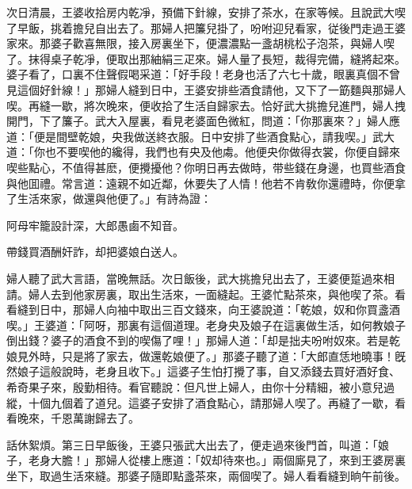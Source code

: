 次日清晨，王婆收拾房内乾凈，預備下針線，安排了茶水，在家等候。且說武大喫了早飯，挑着擔兒自出去了。那婦人把簾兒掛了，吩咐迎兒看家，従後門走過王婆家來。那婆子歡喜無限，接入房裏坐下，便濃濃點一盞胡桃松子泡茶，與婦人喫了。抹得桌子乾凈，便取出那紬絹三疋來。婦人量了長短，裁得完備，縫將起來。婆子看了，口裏不住聲假喝采道：「好手段！老身也活了六七十歲，眼裏真個不曾見這個好針線！」那婦人縫到日中，王婆安排些酒食請他，又下了一筯麵與那婦人喫。再縫一歇，將次晚來，便收拾了生活自歸家去。恰好武大挑擔兒進門，婦人拽開門，下了簾子。武大入屋裏，看見老婆面色微紅，問道：「你那裏來？」婦人應道：「便是間壁乾娘，央我做送終衣服。日中安排了些酒食點心，請我喫。」武大道：「你也不要喫他的纔得，我們也有央及他䖏。他便央你做得衣裳，你便自歸來喫些點心，不值得甚麽，便攪擾他？你明日再去做時，带些錢在身邊，也買些酒食與他囬禮。常言道：遠親不如近鄰，休要失了人情！他若不肯敎你還禮時，你便拿了生活來家，做還與他便了。」有詩為證：

\begin{myquote}
阿母牢籠設計深，大郎愚鹵不知音。

帶錢買酒酬奸詐，却把婆娘白送人。
\end{myquote}

婦人聽了武大言語，當晚無話。次日飯後，武大挑擔兒出去了，王婆便踅過來相請。婦人去到他家房裏，取出生活來，一面縫起。王婆忙點茶來，與他喫了茶。看看縫到日中，那婦人向袖中取出三百文錢來，向王婆說道：「乾娘，奴和你買盞酒喫。」王婆道：「阿呀，那裏有這個道理。老身央及娘子在這裏做生活，如何教娘子倒出錢？婆子的酒食不到的喫傷了哩！」那婦人道：「却是拙夫吩咐奴來。若是乾娘見外時，只是將了家去，做還乾娘便了。」那婆子聽了道：「大郎直恁地曉事！旣然娘子這般說時，老身且收下。」這婆子生怕打攪了事，自又添錢去買好酒好食、希奇果子來，殷勤相待。看官聽說：但凡世上婦人，由你十分精細，被小意兒過縱，十個九個着了道兒。這婆子安排了酒食點心，請那婦人喫了。再縫了一歇，看看晚來，千恩萬謝歸去了。

話休絮煩。第三日早飯後，王婆只張武大出去了，便走過來後門首，叫道：「娘子，老身大膽！」那婦人從樓上應道：「奴却待來也。」兩個廝見了，來到王婆房裏坐下，取過生活來縫。那婆子隨即點盞茶來，兩個喫了。婦人看看縫到晌午前後。

